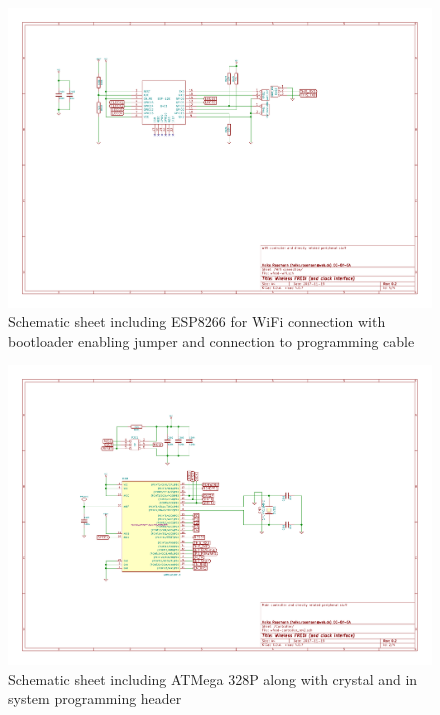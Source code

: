 \documentclass[11pt,a4paper]{scrartcl}
\begin{document}
\begin{figure}[tbh]
  \centering
  \includegraphics[width=\textwidth]{images/old_wfred-wifi-Wifi_connection}
  \caption{Schematic sheet including ESP8266 for WiFi connection with bootloader enabling jumper and connection to programming cable}
  \label{oldSchematicPage2}
\end{figure}

\begin{figure}[tbh]
  \centering
  \includegraphics[width=\textwidth]{images/old_wfred-controller_rev2-Controller}
  \caption{Schematic sheet including ATMega 328P along with crystal and in system programming header}
  \label{oldSchematicPage3}
\end{figure}
\end{document}
